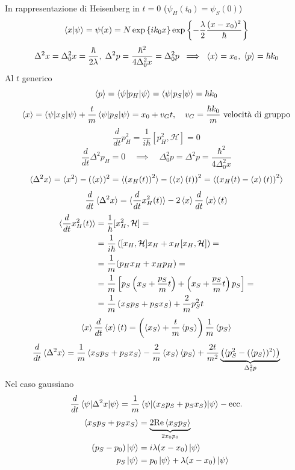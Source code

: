 \bigskip
\noindent
In rappresentazione di Heisenberg in \( t = 0 \) (\( \psi_H(t_0) = \psi_S(0) \))
\[
\braket{x|\psi} = \psi(x) = N \exp \left\{ i k_0 x \right\} \exp \left\{ -\frac{\lambda}{2} \frac{(x - x_0)^2}{\hbar} \right\}
\]
\[
\Delta^2 x = \Delta_0^2 x = \frac{\hbar}{2\lambda}, \; \Delta^2 p = \frac{\hbar^2}{4 \Delta_0^2 x} = \Delta_0^2 p \; \implies \; \braket{x} = x_0, \; \braket{p} = \hbar k_0
\]
Al \( t \) generico
\[
\braket{p} = \braket{\psi|p_H|\psi} = \braket{\psi|p_S|\psi} = \hbar k_0
\]
\[
\braket{x} = \braket{\psi|x_S|\psi} + \frac{t}{m} \braket{\psi|p_S|\psi} = x_0 + v_G t, \quad v_G = \frac{\hbar k_0}{m} \text{ velocità di gruppo}
\]
\[
\frac{d}{dt} p_H^2 = \frac{1}{i\hbar} \left[ p_H^2, \mathcal{H} \right] = 0
\]
\[
\frac{d}{dt} \Delta^2 p_H = 0 \quad \implies \quad \Delta_0^2 p = \Delta^2 p = \frac{\hbar^2}{4 \Delta_0^2 x}
\]
\[
\braket{\Delta^2 x} = \braket{x^2} - (\braket{x})^2 = \braket{\left( x_H(t) \right)^2} - \left( \braket{x}(t) \right)^2 = \braket{\left( x_H(t) - \braket{x}(t) \right)^2}
\]
\[
\frac{d}{dt} \braket{\Delta^2 x} = \braket{\frac{d}{dt} x_H^2(t)} - 2 \braket{x} \frac{d}{dt} \braket{x}(t)
\]
\begin{align*}
\braket{\frac{d}{dt} x_H^2(t)} &= \frac{1}{\hbar} [x_H^2, \mathcal{H}] = \\
&= \frac{1}{i\hbar} \left( [x_H, \mathcal{H}] x_H + x_H [x_H, \mathcal{H}] \right) = \\
&= \frac{1}{m} (p_H x_H + x_H p_H) = \\
&= \frac{1}{m} \left[ p_S \left( x_S + \frac{p_S}{m} t \right) + \left( x_S + \frac{p_S}{m} t \right) p_S \right] = \\
&= \frac{1}{m} \left( x_S p_S + p_S x_S \right) + \frac{2}{m} p_S^2 t
\end{align*}
\[
\braket{x} \frac{d}{dt} \braket{x}(t) = \left( \braket{x_S} + \frac{t}{m} \braket{p_S} \right) \frac{1}{m} \braket{p_S}
\]
\[
\frac{d}{dt} \braket{\Delta^2 x} = \frac{1}{m} \braket{x_S p_S + p_S x_S} - \frac{2}{m} \braket{x_S} \braket{p_S} + \frac{2t}{m^2} \underbrace{\left( \braket{p_S^2 - (\braket{p_S})^2} \right)}_{\Delta_0^2 p}
\]
Nel caso gaussiano
\[
\frac{d}{dt} \braket{\psi|\Delta^2 x|\psi} = \frac{1}{m} \braket{\psi|(x_S p_S + p_S x_S)|\psi} - \text{ecc.}
\]
\begin{align*}
\braket{x_S p_S + p_S x_S} &= \underbrace{2 \text{Re} \braket{x_S p_S}}_{2 x_0 p_0} \\
(p_S - p_0) \ket{\psi} &= i \lambda (x - x_0) \ket{\psi} \\
p_S \ket{\psi} &= p_0 \ket{\psi} + \lambda (x - x_0) \ket{\psi} 
\end{align*}
